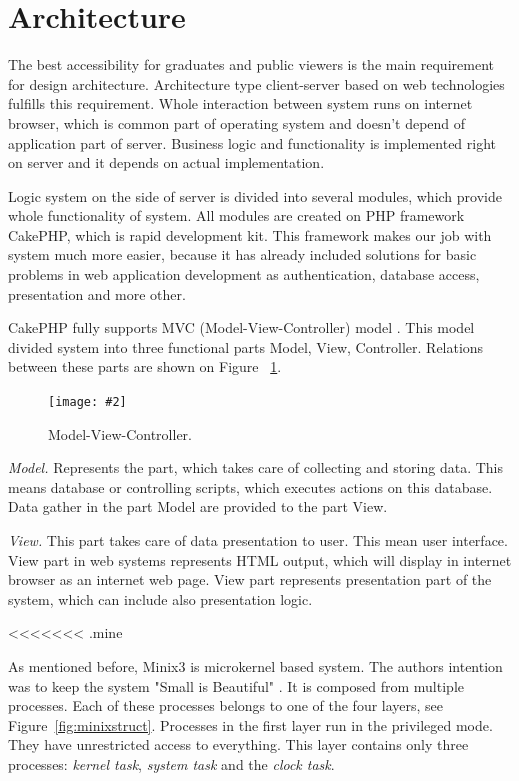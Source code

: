\documentclass{iitsrc}[2006/14/02]
\newcommand\fig[4]{%
	\begin{figure}[h]
	\begin{center}
	\texttt{[image: \#2]}
	~\\%
	\caption{#4}
	\label{#3}
	\end{center}
	\end{figure}
}
\begin{document}
\section{Architecture}

The best accessibility for graduates and public viewers is the main requirement for design architecture. Architecture type client-server based on web technologies fulfills this requirement. Whole interaction between system runs on internet browser, which is common part of operating system and doesn’t depend of application part of server. Business logic and functionality is implemented right on server and it depends on actual implementation.

Logic system on the side of server is divided into several modules, which provide whole functionality of system. All modules are created on PHP framework CakePHP,  which is rapid development kit. This framework makes our job with system much more easier, because it has already included solutions for basic problems in web application development as authentication, database access, presentation and more other.

CakePHP fully supports MVC (Model-View-Controller) model \cite{cakephp}. This model divided system into three functional parts Model, View, Controller. Relations between these parts are shown on Figure ~\ref{fig:mvc}. 

\fig{width=7cm}{images/mvc}{fig:mvc}{Model-View-Controller.}

{\em Model.} Represents the part, which takes care of collecting and storing data. This means database or controlling scripts, which executes actions on this database. Data gather in the part Model are provided to the part View.

{\em View.} This part takes care of data presentation to user. This mean user interface.  View part in web systems represents HTML output, which will display in internet browser as an internet web page. View part represents presentation part of the system, which can include also presentation logic.

<<<<<<< .mine
 
As mentioned before, Minix3 is microkernel based system. The authors intention was to keep the system "Small is Beautiful" \cite[page 17]{osdesign}.
It is composed from multiple processes. Each of these processes belongs to one of the four layers, see Figure~\ref{fig:minixstruct}. Processes in the first layer run in the privileged mode. They have unrestricted access to everything. This layer contains only three processes: {\em kernel task}, {\em system task} and the {\em clock task}.
\end{document}
